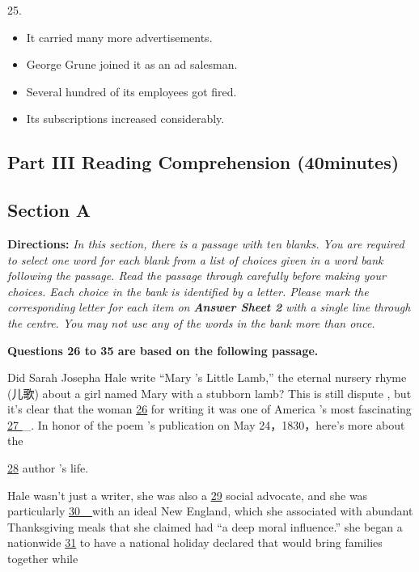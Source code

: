 \documentclass[UTF8,11pt]{ctexart}
\begin{document}
25.


\begin{itemize}[leftmargin=2em,itemsep=.2em,topsep=.4em]\item[A.] It carried many more advertisements.
\item[B.] George Grune joined it as an ad salesman.
\item[C.] Several hundred of its employees got fired.
\item[D.] Its subscriptions increased considerably.
\end{itemize}

\subsection*{\textbf{Part III} \textbf{Reading} \textbf{Comprehension} \textbf{(40minutes)}}


\subsection*{\textbf{Section A}}


\textbf{Directions:}\textit{ In this section, there is a passage with ten blanks. You are required to select one word for each} \textit{blank from a list of choices given in a word bank following the passage. Read the passage through carefully} \textit{before making your choices. Each choice in the bank is identified by a letter. Please mark the corresponding} \textit{letter for each item on}\textbf{\textit{ Answer Sheet 2}}\textit{ with a single line through the centre. You may not use any of the} \textit{words in the bank more than once.}


\textbf{Questions 26 to 35 are based on the following passage.}


Did Sarah Josepha Hale write “Mary 's Little Lamb,” the eternal nursery rhyme (儿歌) about a girl named Mary with a stubborn lamb? This is still dispute , but it’s clear that the woman \uline{26} for writing it was one of America 's most fascinating \uline{27 }\_. In honor of the poem 's publication on May 24，1830，here’s more about the


\uline{28} author 's life.


Hale wasn’t just a writer, she was also a \uline{29} social advocate, and she was particularly \uline{30\_ }with an ideal New England, which she associated with abundant Thanksgiving meals that she claimed had “a deep moral influence.” she began a nationwide \uline{31} to have a national holiday declared that would bring families together while
\end{document}
